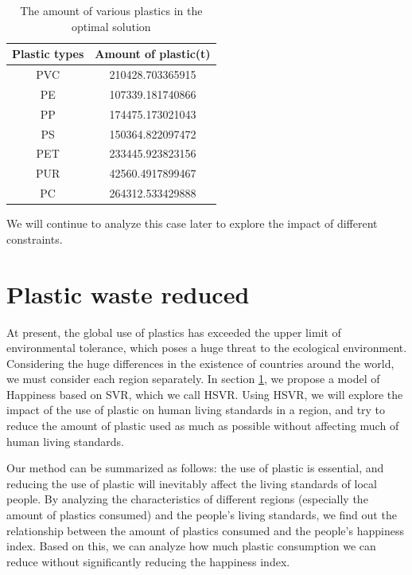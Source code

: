 \documentclass{mcmthesis}
\begin{document}
\begin{table}[]
	\center
	\caption{The amount of various plastics in the optimal solution}
	\label{aos}
	\begin{tabular}{|c|c|}
		\hline
		\textbf{Plastic types} & Amount of plastic(t) \\ \hline
		PVC                    & 210428.703365915     \\ \hline
		PE                     & 107339.181740866     \\ \hline
		PP                     & 174475.173021043     \\ \hline
		PS                     & 150364.822097472     \\ \hline
		PET                    & 233445.923823156     \\ \hline
		PUR                    & 42560.4917899467     \\ \hline
		PC                     & 264312.533429888     \\ \hline
	\end{tabular}
\end{table}

We will continue to analyze this case later to explore the impact of different constraints.

\section{Plastic waste reduced}

\label{p2}

At present, the global use of plastics has exceeded the upper limit of environmental tolerance, which poses a huge threat to the ecological environment. Considering the huge differences in the existence of countries around the world, we must consider each region separately. In section \ref{p2}, we propose a model of Happiness based on SVR\cite{Smola}, which we call HSVR. Using HSVR, we will explore the impact of the use of plastic on human living standards in a region, and try to reduce the amount of plastic used as much as possible without affecting much of human living standards.

Our method can be summarized as follows: the use of plastic is essential, and reducing the use of plastic will inevitably affect the living standards of local people. By analyzing the characteristics of different regions (especially the amount of plastics consumed) and the people's living standards, we find out the relationship between the amount of plastics consumed and the people's happiness index. Based on this, we can analyze how much plastic consumption we can reduce without significantly reducing the happiness index.
\end{document}
